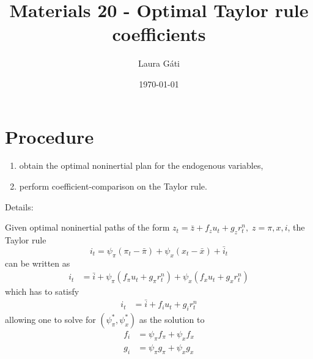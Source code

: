 \documentclass[11pt]{article}
\renewcommand{\[}{\begin{equation}}
\renewcommand{\]}{\end{equation}}
\begin{document}
\linespread{1.0}

\title{Materials 20 - Optimal Taylor rule coefficients}
\author{Laura G\'ati} 
\date{\today}
\maketitle


\tableofcontents


\section{Procedure}
\begin{enumerate}
\item obtain the optimal noninertial plan for the endogenous variables,
\item  perform coefficient-comparison on the Taylor rule.
\end{enumerate}

Details:

\noindent Given optimal noninertial paths of the form $z_t = \bar{z} + f_zu_t + g_z r_t^n, \; z = {\pi,x,i}$, the Taylor rule
\begin{equation}
i_t = \psi_{\pi}(\pi_t -\bar{\pi}) + \psi_{x} (x_t -\bar{x}) + \bar{i}_t  \label{TR}
\end{equation}
can be written as
\begin{align}
i_t & = \bar{i} + \psi_{\pi}(f_{\pi}u_t + g_{\pi}r_t^n) + \psi_x(f_{x}u_t + g_{x}r_t^n)
\end{align}
which has to satisfy
\begin{align}
i_t & = \bar{i} + f_i u_t + g_i r^n_t
\end{align}
allowing one to solve for $(\psi_{\pi}^*, \psi_x^*)$ as the solution to
\begin{align}
f_i & = \psi_{\pi}f_{\pi} + \psi_xf_{x} \\
g_i & = \psi_{\pi}g_{\pi} + \psi_xg_{x}
\end{align}
\end{document}
